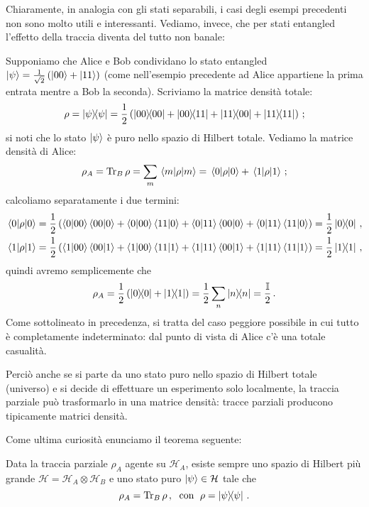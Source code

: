 \noindent Chiaramente, in analogia con gli stati separabili, i casi degli esempi precedenti non sono molto utili e interessanti. Vediamo, invece, che per stati entangled l'effetto della traccia diventa del tutto non banale:

\begin{esempio}
    Supponiamo che Alice e Bob condividano lo stato entangled $\ket{\psi} = \frac{1}{\sqrt{2}} \left( \ket{00} + \ket{11} \right)$ (come nell'esempio precedente ad Alice appartiene la prima entrata mentre a Bob la seconda). Scriviamo la matrice densità totale:
    \begin{equation*}
        \rho = \ketbra{\psi} = \frac{1}{2} \left( \ketbra{00} + \ketbra{00}{11} + \ketbra{11}{00} + \ketbra{11} \right) \, ;
    \end{equation*}
    si noti che lo stato $\ket{\psi}$ è puro nello spazio di Hilbert totale. Vediamo la matrice densità di Alice:
    \begin{equation*}
        \rho_A = \Tr_B \rho = \sum_m \expval{\rho}{m} = \expval{\rho}{0} + \expval{\rho}{1} \, ;
    \end{equation*}
    calcoliamo separatamente i due termini:
    \begin{align*}
        \expval{\rho}{0} &= \frac{1}{2} \left( \braket{0}{00} \braket{00}{0} + \braket{0}{00} \braket{11}{0} + \braket{0}{11} \braket{00}{0} + \braket{0}{11} \braket{11}{0} \right) = \frac{1}{2} \ketbra{0} \, , \\
        \expval{\rho}{1} &= \frac{1}{2} \left( \braket{1}{00} \braket{00}{1} + \braket{1}{00} \braket{11}{1} + \braket{1}{11} \braket{00}{1} + \braket{1}{11} \braket{11}{1} \right) = \frac{1}{2} \ketbra{1} \, ,
    \end{align*}
    quindi avremo semplicemente che
    \begin{equation*}
        \rho_A = \frac{1}{2} \left( \ketbra{0} + \ketbra{1} \right) = \frac{1}{2} \sum_n \ketbra{n} = \frac{\mathbb{I}}{2} \, .
    \end{equation*}
    Come sottolineato in precedenza, si tratta del caso peggiore possibile in cui tutto è completamente indeterminato: dal punto di vista di Alice c'è una totale casualità. 
\end{esempio}

\noindent Perciò anche se si parte da uno stato puro nello spazio di Hilbert totale (universo) e si decide di effettuare un esperimento solo localmente, la traccia parziale pu\`o trasformarlo  in una matrice densità: tracce parziali producono tipicamente matrici densità. 

\noindent Come ultima curiosità enunciamo il teorema seguente:
\begin{teorema}
    Data la traccia parziale $\rho_A$ agente su $\mathcal{H}_A$, esiste sempre uno spazio di Hilbert più grande $\mathcal{H} = \mathcal{H}_A \otimes \mathcal{H}_B$ e uno stato puro $\ket{\psi} \in \mathcal{H}$ tale che
    \begin{equation*}
        \rho_A = \Tr_B \rho \, , \; \text{ con } \; \rho = \ketbra{\psi} \, .
    \end{equation*}
\end{teorema}